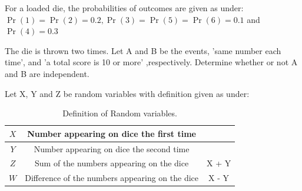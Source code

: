 \documentclass[]{article}
\begin{document}
\providecommand{\qfunc}[1]{\ensuremath{Q\left(#1\right)}}
\providecommand{\gauss}[2]{\mathcal{N}\ensuremath{\left(#1,#2\right)}}
\providecommand{\diff}[2]{\ensuremath{\frac{d{#1}}{d{#2}}}}
\providecommand{\myceil}[1]{\left \lceil #1 \right \rceil }
\newcommand\figref{Fig.~\ref}
\newcommand\tabref{Table~\ref}
\newcommand{\sinc}{\,\text{sinc}\,}
\newcommand{\rect}{\,\text{rect}\,}

\let\vec\mathbf

For a loaded die, the probabilities of outcomes are given as under:
$\Pr(1) = \Pr(2) = 0.2, \Pr(3) = \Pr(5) = \Pr(6) = 0.1$ and $\Pr(4) = 0.3$

The die is thrown two times. Let A and B be the events, 'same number each time', and
'a total score is 10 or more' ,respectively. Determine whether or not A and B are independent.

\solution
Let X, Y and Z be random variables with definition given as under:
\begin{table}[H]
\centering
\begin{tabular}{|c|c|c|}
    \hline
    $X$ & Number appearing on dice the first time & \\
    \hline
    $Y$ & Number appearing on dice the second time & \\
    \hline
    $Z$ & Sum of the numbers appearing on the dice & X + Y\\
    \hline
    $W$ & Difference of the numbers appearing on the dice & X - Y\\
    \hline
\end{tabular}
\label{tab:ncert/12/13/3/1/}
\caption{Definition of Random variables.}
\end{table}
\end{document}
